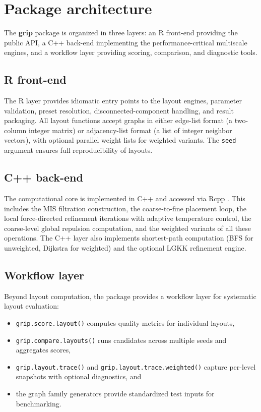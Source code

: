 \section{Package architecture}\label{sec:architecture}

The \textbf{grip} package is organized in three layers: an R front-end
providing the public API, a C++ back-end implementing the
performance-critical multiscale engines, and a workflow layer providing
scoring, comparison, and diagnostic tools.

\subsection{R front-end}

The R layer provides idiomatic entry points to the layout engines,
parameter validation, preset resolution, disconnected-component
handling, and result packaging. All layout functions accept graphs in
either edge-list format (a two-column integer matrix) or adjacency-list
format (a list of integer neighbor vectors), with optional parallel
weight lists for weighted variants. The \texttt{seed} argument ensures
full reproducibility of layouts.

\subsection{C++ back-end}

The computational core is implemented in C++ and accessed via Rcpp
\citep{eddelbuettel2011}. This includes the MIS filtration construction,
the coarse-to-fine placement loop, the local force-directed refinement
iterations with adaptive temperature control, the coarse-level global
repulsion computation, and the weighted variants of all these operations.
The C++ layer also implements shortest-path computation (BFS for
unweighted, Dijkstra for weighted) and the optional LGKK refinement
engine.

\subsection{Workflow layer}

Beyond layout computation, the package provides a workflow layer for
systematic layout evaluation:
%
\begin{itemize}
\item \texttt{grip.score.layout()} computes quality metrics for
  individual layouts,
\item \texttt{grip.compare.layouts()} runs candidates across multiple
  seeds and aggregates scores,
\item \texttt{grip.layout.trace()} and \texttt{grip.layout.trace.weighted()}
  capture per-level snapshots with optional diagnostics, and
\item the graph family generators provide standardized test inputs for
  benchmarking.
\end{itemize}

